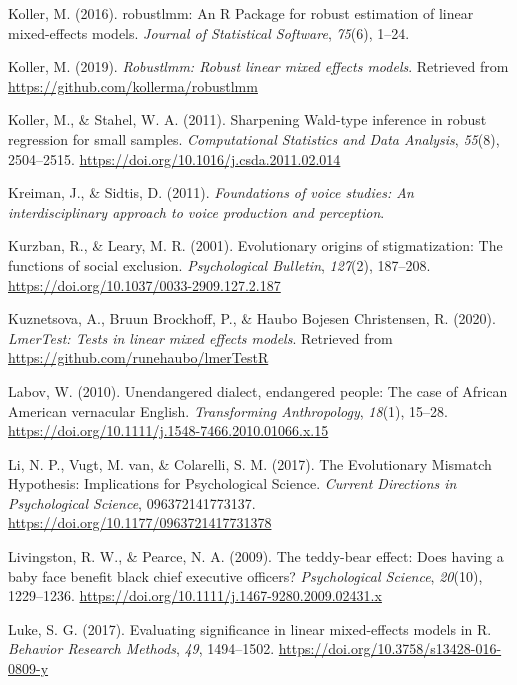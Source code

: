 \documentclass[
  english,
  man, noextraspace,floatsintext]{apa6}
\newlength{\cslhangindent}
\newenvironment{cslreferences}%
  {\setlength{\parindent}{0pt}%
  \everypar{\setlength{\hangindent}{\cslhangindent}}\ignorespaces}%
  {\par}
\begin{document}
\begin{cslreferences}
\leavevmode\hypertarget{ref-Koller2016}{}%
Koller, M. (2016). robustlmm: An R Package for robust estimation of linear mixed-effects models. \emph{Journal of Statistical Software}, \emph{75}(6), 1--24.

\leavevmode\hypertarget{ref-R-robustlmm}{}%
Koller, M. (2019). \emph{Robustlmm: Robust linear mixed effects models}. Retrieved from \url{https://github.com/kollerma/robustlmm}

\leavevmode\hypertarget{ref-Koller2011}{}%
Koller, M., \& Stahel, W. A. (2011). Sharpening Wald-type inference in robust regression for small samples. \emph{Computational Statistics and Data Analysis}, \emph{55}(8), 2504--2515. \url{https://doi.org/10.1016/j.csda.2011.02.014}

\leavevmode\hypertarget{ref-Kreiman2011}{}%
Kreiman, J., \& Sidtis, D. (2011). \emph{Foundations of voice studies: An interdisciplinary approach to voice production and perception}.

\leavevmode\hypertarget{ref-Kurzban2001}{}%
Kurzban, R., \& Leary, M. R. (2001). Evolutionary origins of stigmatization: The functions of social exclusion. \emph{Psychological Bulletin}, \emph{127}(2), 187--208. \url{https://doi.org/10.1037/0033-2909.127.2.187}

\leavevmode\hypertarget{ref-R-lmerTest}{}%
Kuznetsova, A., Bruun Brockhoff, P., \& Haubo Bojesen Christensen, R. (2020). \emph{LmerTest: Tests in linear mixed effects models}. Retrieved from \url{https://github.com/runehaubo/lmerTestR}

\leavevmode\hypertarget{ref-Labov2010}{}%
Labov, W. (2010). Unendangered dialect, endangered people: The case of African American vernacular English. \emph{Transforming Anthropology}, \emph{18}(1), 15--28. \url{https://doi.org/10.1111/j.1548-7466.2010.01066.x.15}

\leavevmode\hypertarget{ref-Li2017}{}%
Li, N. P., Vugt, M. van, \& Colarelli, S. M. (2017). The Evolutionary Mismatch Hypothesis: Implications for Psychological Science. \emph{Current Directions in Psychological Science}, 096372141773137. \url{https://doi.org/10.1177/0963721417731378}

\leavevmode\hypertarget{ref-Livingston2009}{}%
Livingston, R. W., \& Pearce, N. A. (2009). The teddy-bear effect: Does having a baby face benefit black chief executive officers? \emph{Psychological Science}, \emph{20}(10), 1229--1236. \url{https://doi.org/10.1111/j.1467-9280.2009.02431.x}

\leavevmode\hypertarget{ref-Luke2017}{}%
Luke, S. G. (2017). Evaluating significance in linear mixed-effects models in R. \emph{Behavior Research Methods}, \emph{49}, 1494--1502. \url{https://doi.org/10.3758/s13428-016-0809-y}


\end{cslreferences}
\end{document}
